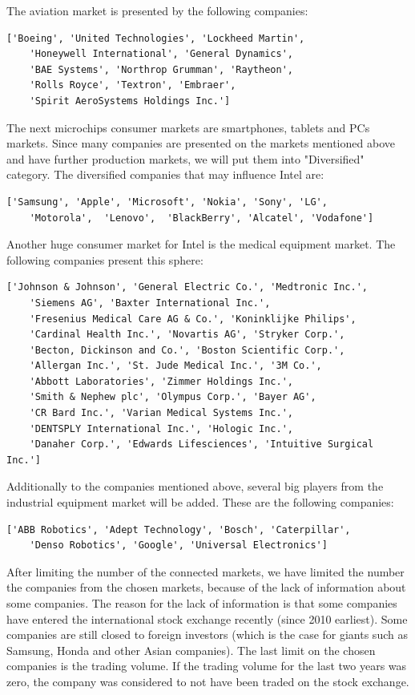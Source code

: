 \documentclass[
  twoside,
  11pt, a4paper,
  footinclude=true,
  headinclude=true,
  cleardoublepage=empty
]{scrreprt}
\begin{document}
    The aviation market is presented by the following companies: 
    \begin{lstlisting}[basicstyle=\footnotesize]
    ['Boeing', 'United Technologies', 'Lockheed Martin',
    'Honeywell International', 'General Dynamics',
    'BAE Systems', 'Northrop Grumman', 'Raytheon',
    'Rolls Royce', 'Textron', 'Embraer', 
    'Spirit AeroSystems Holdings Inc.']
    \end{lstlisting}
    The next microchips consumer markets are smartphones, tablets and PCs markets. Since many companies are presented on the markets mentioned above and have further production markets, we will put them into "Diversified" category. The diversified companies that may influence Intel are:
    \begin{lstlisting}[basicstyle=\footnotesize]
    ['Samsung', 'Apple', 'Microsoft', 'Nokia', 'Sony', 'LG',
    'Motorola',  'Lenovo',  'BlackBerry', 'Alcatel', 'Vodafone']
    \end{lstlisting} 
    Another huge consumer market for Intel is the medical equipment market. The following companies present this sphere:
    \begin{lstlisting}[basicstyle=\footnotesize]
    ['Johnson & Johnson', 'General Electric Co.', 'Medtronic Inc.',
    'Siemens AG', 'Baxter International Inc.', 
    'Fresenius Medical Care AG & Co.', 'Koninklijke Philips',
    'Cardinal Health Inc.', 'Novartis AG', 'Stryker Corp.',
    'Becton, Dickinson and Co.', 'Boston Scientific Corp.',
    'Allergan Inc.', 'St. Jude Medical Inc.', '3M Co.',
    'Abbott Laboratories', 'Zimmer Holdings Inc.', 
    'Smith & Nephew plc', 'Olympus Corp.', 'Bayer AG',
    'CR Bard Inc.', 'Varian Medical Systems Inc.',
    'DENTSPLY International Inc.', 'Hologic Inc.', 
    'Danaher Corp.', 'Edwards Lifesciences', 'Intuitive Surgical Inc.']
    \end{lstlisting}
    Additionally to the companies mentioned above, several big players from the industrial equipment market will be added. These are the following companies:
    \begin{lstlisting}[basicstyle=\footnotesize]
    ['ABB Robotics', 'Adept Technology', 'Bosch', 'Caterpillar',
    'Denso Robotics', 'Google', 'Universal Electronics']
    \end{lstlisting}
    After limiting the number of the connected markets, we have limited the number the companies from the chosen markets, because of the lack of  information about some companies. The reason for the lack of information is that some companies have entered the international stock exchange recently (since 2010 earliest). Some companies are still closed to foreign investors (which is the case for giants such as Samsung, Honda and other Asian companies). The last limit on the chosen companies is the trading volume. If the trading volume for the last two years was zero, the company was considered to not have been traded on the stock exchange.\\
\end{document}
